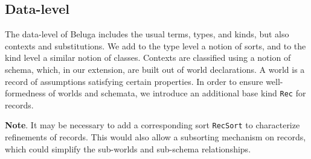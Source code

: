 \documentclass[letterpaper, 11pt]{article}
\begin{document}
    \subsection{Data-level}
    The data-level of Beluga includes the usual terms, types, and kinds, but also contexts and substitutions.  We add to the type level a notion of sorts,
    and to the kind level a similar notion of classes.  Contexts are classified using a notion of schema, which, in our extension, are built out of
    world declarations.  A world is a record of assumptions satisfying certain properties.  In order to ensure well-formedness 
    of worlds and schemata, we introduce an additional base kind \texttt{Rec} for records.  

    \textbf{Note}. It may be necessary to add a corresponding sort \texttt{RecSort} to characterize refinements of records.  This would also allow a
    subsorting mechanism on records, which could simplify the sub-worlds and sub-schema relationships.  
\end{document}
